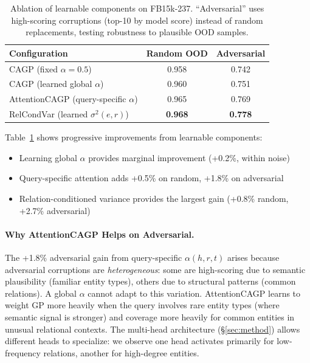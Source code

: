 \begin{table}[t]
\centering
\caption{Ablation of learnable components on FB15k-237. ``Adversarial'' uses high-scoring corruptions (top-10 by model score) instead of random replacements, testing robustness to plausible OOD samples.}
\label{tab:ablation}
\vspace{0.5em}
\small
\begin{tabular}{lcc}
\toprule
Configuration & Random OOD & Adversarial \\
\midrule
CAGP (fixed $\alpha=0.5$) & 0.958 & 0.742 \\
CAGP (learned global $\alpha$) & 0.960 & 0.751 \\
AttentionCAGP (query-specific $\alpha$) & 0.965 & 0.769 \\
RelCondVar (learned $\sigma^2(e,r)$) & \textbf{0.968} & \textbf{0.778} \\
\bottomrule
\end{tabular}
\end{table}

Table~\ref{tab:ablation} shows progressive improvements from learnable components:
\begin{itemize}
    \item Learning global $\alpha$ provides marginal improvement (+0.2\%, within noise)
    \item Query-specific attention adds +0.5\% on random, +1.8\% on adversarial
    \item Relation-conditioned variance provides the largest gain (+0.8\% random, +2.7\% adversarial)
\end{itemize}

\paragraph{Why AttentionCAGP Helps on Adversarial.}
The +1.8\% adversarial gain from query-specific $\alpha(h,r,t)$ arises because adversarial corruptions are \emph{heterogeneous}: some are high-scoring due to semantic plausibility (familiar entity types), others due to structural patterns (common relations).
A global $\alpha$ cannot adapt to this variation.
AttentionCAGP learns to weight GP more heavily when the query involves rare entity types (where semantic signal is stronger) and coverage more heavily for common entities in unusual relational contexts.
The multi-head architecture (\S\ref{sec:method}) allows different heads to specialize: we observe one head activates primarily for low-frequency relations, another for high-degree entities.


